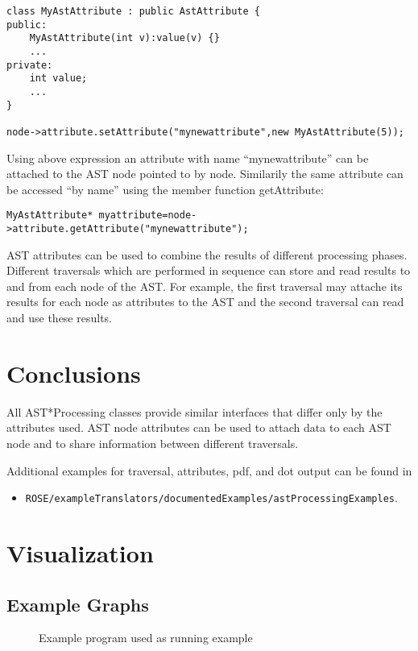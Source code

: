 \begin{verbatim}
class MyAstAttribute : public AstAttribute {
public:
	MyAstAttribute(int v):value(v) {}
	...
private:
	int value;
	...
}

node->attribute.setAttribute("mynewattribute",new MyAstAttribute(5));
\end{verbatim}

Using above expression an attribute with name ``mynewattribute'' can
be attached to the AST node pointed to by node. Similarily the same attribute can be accessed ``by name'' using the member function getAttribute:

\begin{verbatim}
MyAstAttribute* myattribute=node->attribute.getAttribute("mynewattribute");
\end{verbatim}

AST attributes can be used to combine the results of different
processing phases. Different traversals which are performed in
sequence can store and read results to and from each node of the
AST. For example, the first traversal may attache its results for each node as
attributes to the AST and the second traversal can read and use these results.

\section{Conclusions}

All AST*Processing classes provide similar interfaces that differ only by the attributes used. AST node attributes can be used to attach data to each AST node and to share information between different traversals. 

Additional examples for traversal, attributes, pdf, and dot output can be found in 
\begin{itemize}
\item \verb+ROSE/exampleTranslators/documentedExamples/astProcessingExamples+.
\end{itemize}

\section{Visualization}

\subsection{Example Graphs}

\begin{figure}
\begin{latexonly}
   
\end{latexonly}

\begin{htmlonly}
   
\end{htmlonly}
\caption{Example program used as running example}
\label{AstProcessing:example1}
\end{figure}

